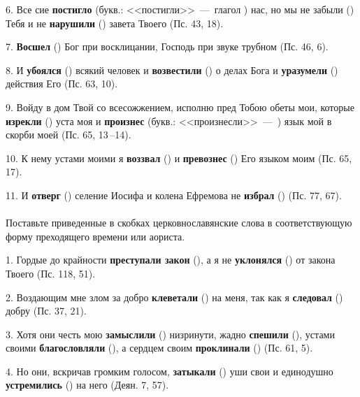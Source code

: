 \documentclass[11pt,a4paper,oneside]{memoir}
\newcommand{\exercise}{}
\begin{document}
    6. Все сие \textbf{постигло} (букв.: <<постигли>>~---~глагол {}) нас, но мы не забыли ({}) Тебя и не \textbf{нарушили} ({}) завета Твоего (Пс. 43, 18).
    
    7. \textbf{Восшел} ({}) Бог при восклицании, Господь при звуке трубном (Пс. 46, 6).
    
    8. И \textbf{убоялся} ({}) всякий человек и \textbf{возвестили} ({}) о делах Бога и \textbf{уразумели} ({}) действия Его (Пс. 63, 10).
    
    9. Войду в дом Твой со всесожжением, исполню пред Тобою обеты мои, которые \textbf{изрекли} ({}) уста моя и \textbf{произнес} (букв.: <<произнесли>>~---~{}) язык мой в скорби моей (Пс. 65, 13\,--14).
    
    10. К нему устами моими я \textbf{воззвал} ({}) и \textbf{превознес} ({}) Его языком моим (Пс. 65, 17).
    
    11. И \textbf{отверг} ({}) селение Иосифа и колена Ефремова не \textbf{избрал} ({}) (Пс. 77, 67).
    
                    \paragraph{\exercise}
                    
    Поставьте приведенные в скобках церковнославянские слова в соответствующую форму преходящего времени или аориста.
    
    1. Гордые до крайности \textbf{преступали закон} ({}), а я не \textbf{уклонялся} ({}) от закона Твоего (Пс. 118, 51).
    
    2. Воздающим мне злом за добро \textbf{клеветали} ({}) на меня, так как я \textbf{следовал} ({}) добру (Пс. 37, 21).
    
    3. Хотя они честь мою \textbf{замыслили} ({}) низринути, жадно \textbf{спешили} ({}), устами своими \textbf{благословляли} ({}), а сердцем своим \textbf{проклинали} ({}) (Пс. 61, 5).
    
    4. Но они, вскричав громким голосом, \textbf{затыкали} ({}) уши свои и единодушно \textbf{устремились} ({}) на него (Деян. 7, 57).
    
\end{document}
